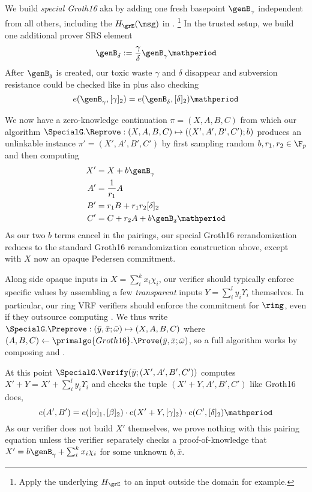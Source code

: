We build {\em special Groth16} aka \SpecialG by adding one fresh
basepoint $\genB_\gamma$ independent from all others,
 including the $H_{\grE}(\msg)$ in \PedVRF.%
\footnote{Apply the underlying $H_\grE$ to an input outside the \msg domain for example.}
In the trusted setup, we build one additional prover SRS element
$$ \genB_\delta := {\gamma\over\delta} \genB_\gamma \mathperiod $$
After $\genB_\delta$ is created, our toxic waste $\gamma$ and $\delta$
disappear and subversion resistance could be checked
 like in \cite{cryptoeprint:2019/1162} plus also checking
$$ e(\genB_\gamma, [\gamma]_2) = e(\genB_\delta, [\delta]_2) \mathperiod $$

We now have a zero-knowledge continuation $\pi = (X,A,B,C)$ from which
our algorithm $\SpecialG.\Reprove : (X,A,B,C) \mapsto ((X',A',B',C'); b)$ produces an
unlinkable instance $\pi' = (X',A',B',C')$ by
 first sampling random $b,r_1,r_2 \in \F_p$ and then computing
$$ \begin{aligned}
X' &= X + b \genB_\gamma \\
A' &= {1 \over r_1} A \\
B' &= r_1 B + r_1 r_2 [\delta]_2 \\
C' &= C + r_2 A + b \genB_\delta \mathperiod \\
\end{aligned} $$
As our two $b$ terms cancel in the pairings, our special Groth16
rerandomization reduces to the standard Groth16 rerandomization
construction above,
 except with $X$ now an opaque Pedersen commitment.


Along side opaque inputs in $X = \sum_i^k x_i \chi_i$,
our verifier should typically enforce specific values by assembling
a few {\em transparent} inputs $Y = \sum_i^l y_i \Upsilon_i$ themselves.
In particular, our ring VRF verifiers should enforce the commitment
\comring for $\ring$, even if they outsource computing \comring.
We thus write $\SpecialG.\Preprove : (\bar{y}, \bar{x}; \bar{\omega}) \mapsto (X,A,B,C)$
where $(A,B,C) \leftarrow \primalgo{Groth16}.\Prove(\bar{y}, \bar{x}; \bar{\omega})$,
so a full \Prove algorithm works by composing \Preprove and \Reprove.

At this point $\SpecialG.\Verify(\bar{y}; (X',A',B',C') )$
 computes $X' + Y = X' + \sum_i^l y_i \Upsilon_i$ and checks
 the tuple $(X' + Y,A',B',C')$ like Groth16 does,
$$ e(A',B') = e([\alpha]_1, [\beta]_2) \cdot
 e(X' + Y, [\gamma]_2) \cdot e(C', [\delta]_2) \mathperiod $$
As our verifier does not build $X'$ themselves, we prove nothing
with this pairing equation unless the verifier separately checks
 a proof-of-knowledge that $X' = b \genB_\gamma + \sum_i^k x_i \chi_i$
 for some unknown $b,\bar{x}$.

